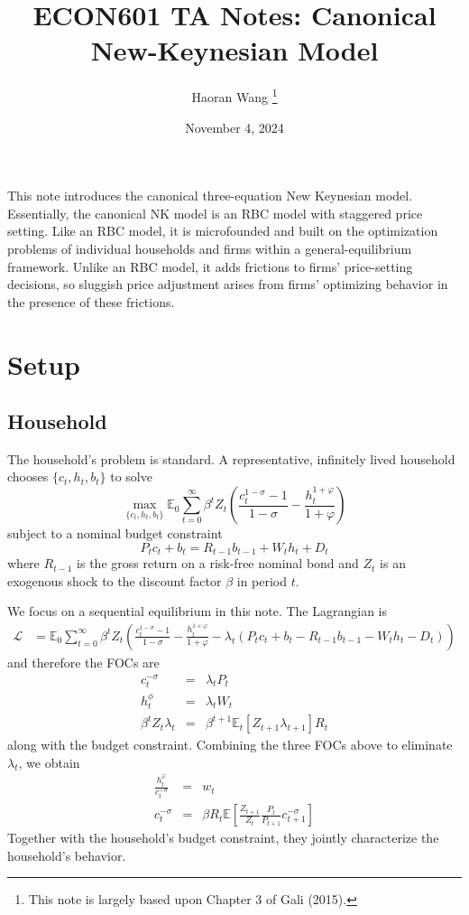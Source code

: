 \documentclass[12pt]{article}
\title{ECON601 TA Notes: Canonical New-Keynesian Model}
\author{Haoran Wang \thanks{This note is largely based upon Chapter 3 of Gali (2015).}}
\date{November 4, 2024}
\newcommand{\E}{\mathbb{E}}
\begin{document}
	\maketitle
	
	\tableofcontents

This note introduces the canonical three-equation New Keynesian model. Essentially, the canonical NK model is an RBC model with staggered price setting. Like an RBC model, it is microfounded and built on the optimization problems of individual households and firms within a general-equilibrium framework. Unlike an RBC model, it adds frictions to firms' price-setting decisions, so sluggish price adjustment arises from firms' optimizing behavior in the presence of these frictions.

\section{Setup}

\subsection{Household} The household's problem is standard. A representative, infinitely lived household chooses $\{c_t, h_t, b_t\}$ to solve
\begin{equation}
	\max_{\{c_t, h_t, b_t\}} \E_0 \sum_{t=0}^\infty \beta^t Z_t \left(\frac{c_t^{1-\sigma}-1}{1-\sigma} - \frac{h_t^{1+\varphi}}{1+\varphi}\right) 
\end{equation} 
subject to a nominal budget constraint
\begin{equation} \label{eq:HH_BC}
	P_t c_t + b_t = R_{t-1} b_{t-1} + W_t h_t + D_t
\end{equation}
where $R_{t-1}$ is the gross return on a risk-free nominal bond and $Z_t$ is an exogenous shock to the discount factor $\beta$ in period $t$. 

We focus on a sequential equilibrium in this note. The Lagrangian is
\begin{align}
	\mathcal{L} &= \E_0 \sum_{t=0}^\infty \beta^t Z_t \left(\frac{c_t^{1-\sigma}-1}{1-\sigma} - \frac{h_t^{1+\varphi}}{1+\varphi} - \lambda_t \left(P_t c_t + b_t - R_{t-1} b_{t-1} - W_t h_t - D_t\right)\right) 
\end{align}
and therefore the FOCs are
\begin{eqnarray}
	c_t^{-\sigma} &=& \lambda_t P_t \\
	h_t^\phi &=& \lambda_t W_t \\
	\beta^t Z_t \lambda_t &=& \beta^{t+1} \E_{t} \left[Z_{t+1}\lambda_{t+1}\right] R_t
\end{eqnarray}
along with the budget constraint. Combining the three FOCs above to eliminate $\lambda_t$, we obtain
\begin{eqnarray}
	\frac{h_t^\varphi}{c_t^{-\sigma}} &=& w_t \label{eq:HH_intra}\\
	c_t^{-\sigma} &=& \beta R_t \E\left[\frac{Z_{t+1}}{Z_t} \frac{P_t}{P_{t+1}}c_{t+1}^{-\sigma}\right] \label{eq:HH_euler}
\end{eqnarray}
Together with the household's budget constraint, they jointly characterize the household's behavior.
\end{document}
